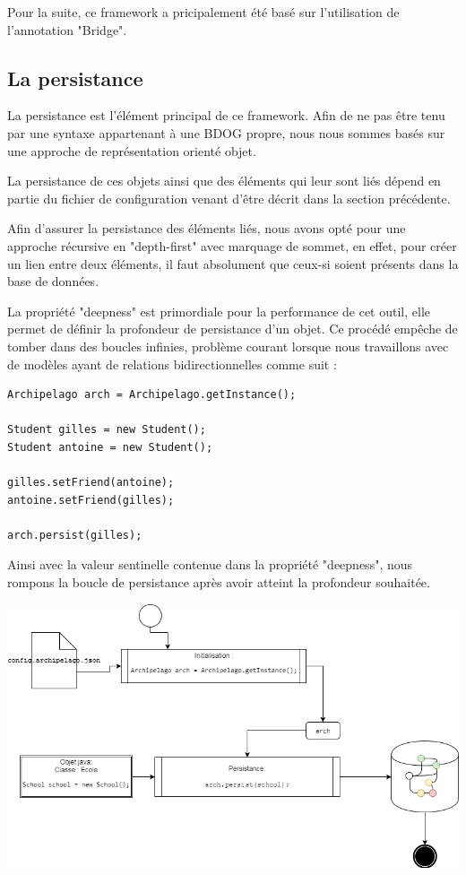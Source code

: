 \documentclass[a4paper,fleqn,12pt]{report}
\begin{document}
Pour la suite, ce framework a pricipalement été basé sur l'utilisation de l'annotation "Bridge".

\subsection{La persistance}


La persistance est l'élément principal de ce framework. Afin de ne pas être tenu par une syntaxe appartenant à une BDOG propre, nous nous sommes basés sur une approche de représentation orienté objet. 

La persistance de ces objets ainsi que des éléments qui leur sont liés  dépend en partie du fichier de configuration venant d'être décrit dans la section précédente. 

Afin d'assurer la persistance des éléments liés, nous avons opté pour une approche récursive en "depth-first" avec marquage de sommet, en effet, pour créer un lien entre deux éléments, il faut absolument que ceux-si soient présents dans la base de données.

La propriété "deepness" est primordiale pour la performance de cet outil, elle permet de définir la profondeur de persistance d'un objet. Ce procédé empêche de tomber dans des boucles infinies, problème courant lorsque nous travaillons avec de modèles ayant de relations bidirectionnelles comme suit : 

\begin{lstlisting}
Archipelago arch = Archipelago.getInstance();

Student gilles = new Student();
Student antoine = new Student();

gilles.setFriend(antoine);
antoine.setFriend(gilles);

arch.persist(gilles);
\end{lstlisting}

Ainsi avec la valeur sentinelle contenue dans la propriété "deepness", nous rompons la boucle de persistance après avoir atteint la profondeur souhaitée.

\begin{center}
\includegraphics[scale=0.5]{figures/Persist.png}
\label{fig:Persist}
\end{center}
    
\end{document}
